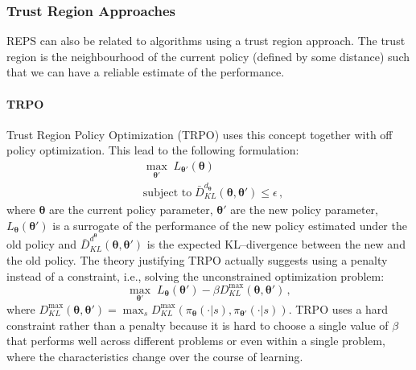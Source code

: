 \subsubsection{Trust Region Approaches}
REPS can also be related to algorithms using a trust region approach. The trust region is the neighbourhood of the current policy (defined by some distance) such that we can have a reliable estimate of the performance.
 \paragraph{TRPO} Trust Region Policy Optimization (TRPO) \citep{trpo} uses this concept together with off policy optimization. This lead to the following formulation:
 \begin{align}
 	 & \max_{\boldsymbol{\theta}'} \; L_{\boldsymbol{\theta}'}(\boldsymbol{\theta}) \\
 	 & \text{subject to} \; \bar{D}_{KL}^{d_{\boldsymbol{\theta}}}(\boldsymbol{\theta},\boldsymbol{\theta}') \leq \epsilon \, ,
 \end{align}
 where $\boldsymbol{\theta}$ are the current policy parameter, $\boldsymbol{\theta}'$ are the new policy parameter,  $L_{\boldsymbol{\theta}}(\boldsymbol{\theta}')$ is a surrogate of the performance of the new policy estimated under the old policy and $\bar{D}_{KL}^{d^{\boldsymbol{\theta}}}(\boldsymbol{\theta}, \boldsymbol{\theta}')$ is the expected KL--divergence between the new and the old policy. 
 The theory justifying TRPO actually suggests using a penalty instead of a constraint, i.e., solving the unconstrained optimization problem:
 \begin{equation}
 	 \max_{\boldsymbol{\theta}'} \; L_{\boldsymbol{\theta}}(\boldsymbol{\theta}') - \beta D_{KL}^{\max}(\boldsymbol{\theta}, \boldsymbol{\theta}') \, ,
 \end{equation}
 where $D_{KL}^{\max}(\boldsymbol{\theta}, \boldsymbol{\theta}') = \max_s D_{KL}^{\max}(\pi_{\boldsymbol{\theta}}(\cdot | s), \pi_{\boldsymbol{\theta}'} (\cdot | s))$.
 TRPO uses a hard constraint rather than a penalty because it is hard to choose a single value of $\beta$ that performs well across different problems or even within a single problem, where the characteristics change over the course of learning.
 \newline
